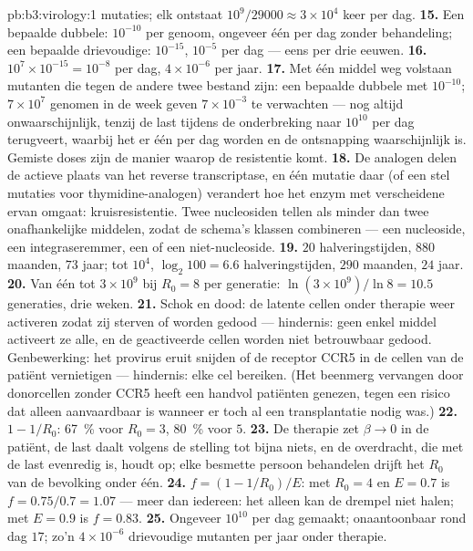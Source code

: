 \begin{solution}{pb:b3:virology:1}
mutaties; elk ontstaat $10^{9}/\num{29000} \approx 3\times 10^{4}$ keer
per dag.
\textbf{15.} Een bepaalde dubbele: $10^{-10}$ per genoom, ongeveer één
per dag zonder behandeling; een bepaalde drievoudige: $10^{-15}$,
$10^{-5}$ per dag --- eens per drie eeuwen.
\textbf{16.} $10^{7}\times 10^{-15} = 10^{-8}$ per dag, $4\times 10^{-6}$
per jaar.
\textbf{17.} Met één middel weg volstaan mutanten die tegen de andere
twee bestand zijn: een bepaalde dubbele met $10^{-10}$; $7\times 10^{7}$
genomen in de week geven $7\times 10^{-3}$ te verwachten --- nog altijd
onwaarschijnlijk, tenzij de last tijdens de onderbreking naar $10^{10}$
per dag terugveert, waarbij het er één per dag worden en de ontsnapping
waarschijnlijk is. Gemiste doses zijn de manier waarop de resistentie
komt.
\textbf{18.} De analogen delen de actieve plaats van het reverse
transcriptase, en één mutatie daar (of een stel mutaties voor
thymidine-analogen) verandert hoe het enzym met verscheidene ervan
omgaat: kruisresistentie. Twee nucleosiden tellen als minder dan twee
onafhankelijke middelen, zodat de schema's klassen combineren --- een
nucleoside, een integraseremmer, een  of een
niet-nucleoside.
\textbf{19.} $20$ halveringstijden, $880$ maanden, $73$ jaar; tot
$10^{4}$, $\log_{2}100 = 6.6$ halveringstijden, $290$ maanden, $24$
jaar.
\textbf{20.} Van één  tot $3\times 10^{9}$ bij $R_{0} = 8$ per
generatie: $\ln(3\times 10^{9})/\ln 8 = 10.5$ generaties, drie weken.
\textbf{21.} Schok en dood: de latente cellen onder therapie weer
activeren zodat zij sterven of worden gedood --- hindernis: geen enkel
middel activeert ze alle, en de geactiveerde cellen worden niet
betrouwbaar gedood. Genbewerking: het provirus eruit snijden of de
receptor CCR5 in de cellen van de patiënt vernietigen --- hindernis:
elke cel bereiken. (Het beenmerg vervangen door donorcellen zonder CCR5
heeft een handvol patiënten genezen, tegen een risico dat alleen
aanvaardbaar is wanneer er toch al een transplantatie nodig was.)
\textbf{22.} $1 - 1/R_{0}$: \qty{67}{\%} voor $R_{0} = 3$, \qty{80}{\%}
voor $5$.
\textbf{23.} De therapie zet $\beta \to 0$ in de patiënt, de last daalt
volgens de stelling tot bijna niets, en de overdracht, die met de last
evenredig is, houdt op; elke besmette persoon behandelen drijft het
$R_{0}$ van de bevolking onder één.
\textbf{24.} $f = (1 - 1/R_{0})/E$: met $R_{0} = 4$ en $E = 0.7$ is $f =
0.75/0.7 = 1.07$ --- meer dan iedereen: het  alleen kan de drempel
niet halen; met $E = 0.9$ is $f = 0.83$.
\textbf{25.} Ongeveer $10^{10}$  per dag gemaakt; onaantoonbaar
rond dag $17$; zo'n $4\times 10^{-6}$ drievoudige mutanten per jaar
onder therapie.
\end{solution}
